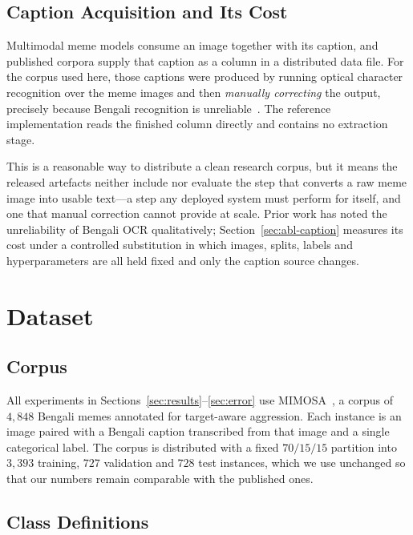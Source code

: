 \documentclass[conference]{IEEEtran}
\begin{document}
\subsection{Caption Acquisition and Its Cost}
\label{sec:related-caption}

Multimodal meme models consume an image together with its caption, and published
corpora supply that caption as a column in a distributed data file. For the
corpus used here, those captions were produced by running optical character
recognition over the meme images and then \emph{manually correcting} the output,
precisely because Bengali recognition is unreliable~\cite{ahsan2024,smith2007}.
The reference implementation reads the finished column directly and contains no
extraction stage.

This is a reasonable way to distribute a clean research corpus, but it means the
released artefacts neither include nor evaluate the step that converts a raw
meme image into usable text---a step any deployed system must perform for
itself, and one that manual correction cannot provide at scale. Prior work has
noted the unreliability of Bengali OCR qualitatively; Section~\ref{sec:abl-caption}
measures its cost under a controlled substitution in which images, splits,
labels and hyperparameters are all held fixed and only the caption source
changes.

\section{Dataset}
\label{sec:dataset}

\subsection{Corpus}

All experiments in Sections~\ref{sec:results}--\ref{sec:error} use
MIMOSA~\cite{ahsan2024}, a corpus of $4{,}848$ Bengali memes annotated for
target-aware aggression. Each instance is an image paired with a Bengali caption
transcribed from that image and a single categorical label. The corpus is
distributed with a fixed $70/15/15$ partition into $3{,}393$ training, $727$
validation and $728$ test instances, which we use unchanged so that our numbers
remain comparable with the published ones.

\subsection{Class Definitions}
\end{document}
